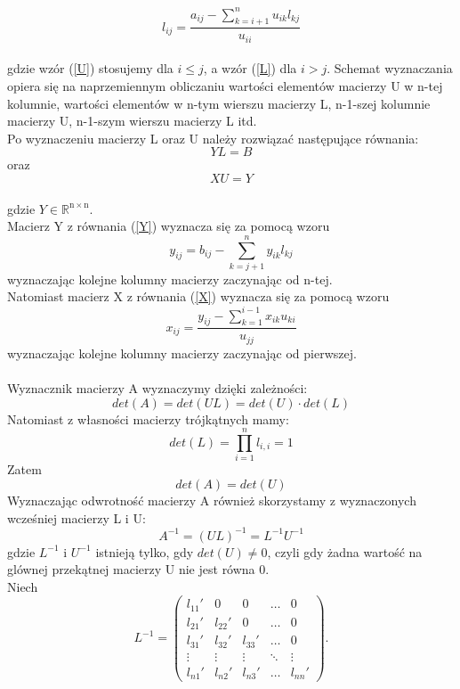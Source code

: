 \documentclass[12pt]{article}
\begin{document}
\begin{equation}
l_{ij}=\dfrac{a_{ij}-\sum_{k=i+1}^n u_{ik}l_{kj}}{u_{ii}} \label{L}
\end{equation}
\\
gdzie wz\'or (\ref{U}) stosujemy dla $i \leq j$, a wz\'or (\ref{L}) dla $i > j$.
Schemat wyznaczania opiera si\k{e} na naprzemiennym obliczaniu warto\'sci element\'ow macierzy U w n-tej kolumnie, warto\'sci element\'ow w n-tym wierszu macierzy L, n-1-szej kolumnie macierzy U, n-1-szym wierszu macierzy L itd.
\\
Po wyznaczeniu macierzy L oraz U nale\.zy rozwi\k{a}za\'c nast\k{e}puj\k{a}ce r\'ownania:
\begin{equation}
YL=B \label{Y}
\end{equation}
oraz
\begin{equation}
XU=Y \label{X}
\end{equation}
\\
gdzie $Y\in \mathbb R^\mathrm{n\times n}$. 
\\
Macierz Y z r\'ownania (\ref{Y}) wyznacza si\k{e} za pomoc\k{a} wzoru
\[
y_{ij}=b_{ij}-\sum_{k=j+1}^n y_{ik}l_{kj} 
\]
wyznaczaj\k{a}c kolejne kolumny macierzy zaczynaj\k{a}c od n-tej. 
\\
 Natomiast macierz X z r\'ownania (\ref{X}) wyznacza si\k{e} za pomoc\k{a} wzoru
 \[
 x_{ij}=\frac{y_{ij}-\sum_{k=1}^{i-1} x_{ik}u_{ki}}{u_{jj}}
 \]
 wyznaczaj\k{a}c kolejne kolumny macierzy zaczynaj\k{a}c od pierwszej. 
\\
\\
Wyznacznik macierzy A wyznaczymy dzi\k{e}ki zale\.zno\'sci:
\[
det(A)=det(UL)=det(U)\cdot det(L)
\]
Natomiast z w\l{}asno\'sci macierzy tr\'ojk\k{a}tnych mamy:
\[
det(L)=\prod_{i=1}^n l_{i,i}=1
\]
Zatem 
\[
det(A)=det(U)
\]
Wyznaczaj\k{a}c odwrotno\'s\'c macierzy A r\'ownie\.z skorzystamy z wyznaczonych wcze\'sniej macierzy L i U:
\[
A^{-1}=(UL)^{-1}=L^{-1}U^{-1}
\]
gdzie $L^{-1}$ i $U^{-1}$ istniej\k{a} tylko, gdy $det(U)\neq 0$, czyli gdy \.zadna warto\'s\'c na gl\'ownej przek\k{a}tnej macierzy U nie jest r\'owna 0.
\\
Niech 
\[
L^{-1}=\begin{pmatrix}
l_{11}' & 0 & 0 & \ldots & 0 \\
l_{21}' & l_{22}' & 0 & \ldots & 0 \\
l_{31}' & l_{32}' & l_{33}' & \ldots & 0 \\
\vdots & \vdots & \vdots & \ddots & \vdots \\
l_{n1}' & l_{n2}' & l_{n3}' & \ldots & l_{nn}'
\end{pmatrix}.
\]
\end{document}
